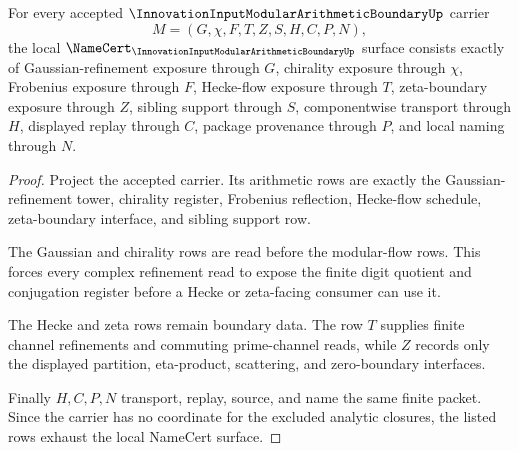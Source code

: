 \begin{theorem}
\label{thm:innovation-input-modular-arithmetic-boundary-namecert-obligations}
For every accepted $\InnovationInputModularArithmeticBoundaryUp$ carrier
$$
M=(G,\chi,F,T,Z,S,H,C,P,N),
$$
the local $\NameCert_{\InnovationInputModularArithmeticBoundaryUp}$ surface consists exactly of Gaussian-refinement exposure through $G$, chirality exposure through $\chi$, Frobenius exposure through $F$, Hecke-flow exposure through $T$, zeta-boundary exposure through $Z$, sibling support through $S$, componentwise transport through $H$, displayed replay through $C$, package provenance through $P$, and local naming through $N$.
\end{theorem}
\begin{proof}
Project the accepted carrier. Its arithmetic rows are exactly the Gaussian-refinement tower, chirality register, Frobenius reflection, Hecke-flow schedule, zeta-boundary interface, and sibling support row.

The Gaussian and chirality rows are read before the modular-flow rows. This forces every complex refinement read to expose the finite digit quotient and conjugation register before a Hecke or zeta-facing consumer can use it.

The Hecke and zeta rows remain boundary data. The row $T$ supplies finite channel refinements and commuting prime-channel reads, while $Z$ records only the displayed partition, eta-product, scattering, and zero-boundary interfaces.

Finally $H,C,P,N$ transport, replay, source, and name the same finite packet. Since the carrier has no coordinate for the excluded analytic closures, the listed rows exhaust the local NameCert surface.
\end{proof}

